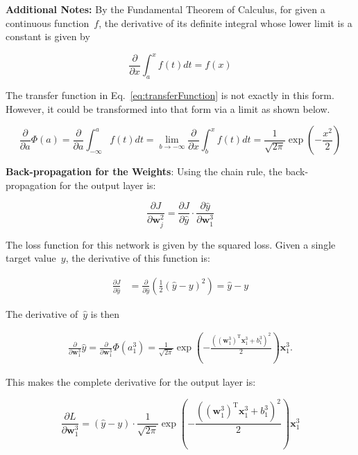 \documentclass{report}
\newcommand{\w}{\mathbf{w}}
\newcommand{\xvec}{\mathbf{x}}
\newcommand{\yhat}{\hat{y}}
\newcommand{\T}{\text{T}}
\begin{document}
  \textbf{Additional Notes:} By the Fundamental Theorem of Calculus, for given a continuous function~$f$, the derivative of its definite integral whose lower limit is a constant is given by
  
  \begin{equation}
    \frac{\partial}{\partial x}\int_{a}^{x}f(t)dt=f(x)
  \end{equation}
  
  The transfer function in Eq.~\ref{eq:transferFunction} is not exactly in this form.  However, it could be transformed into that form via a limit as shown below.
  
  \begin{equation}
    \frac{\partial}{\partial a} \Phi(a) = \frac{\partial}{\partial a} \int_{-\infty}^{a}f(t)dt =\underset{b\rightarrow -\infty}\lim \frac{\partial}{\partial x} \int_{b}^{x}f(t)dt=\frac{1}{\sqrt{2\pi}} \exp\left( -\frac{x^{2}}{2} \right)
  \end{equation}
  
  \textbf{Back-propagation for the Weights}: Using the chain rule, the back-propagation for the output layer is:
  
  \begin{equation}
    \frac{\partial J}{\partial \w_{j}^{2}} = \frac{\partial J}{\partial \yhat} \cdot \frac{\partial \yhat}{\partial \w_{1}^{3}}  
  \end{equation}
  
  The loss function for this network is given by the squared loss.  Given a single target value~$y$, the derivative of this function is:
  
  \begin{align}
    \frac{\partial J}{\partial \yhat} &= \frac{\partial}{\partial \yhat} \left(\frac{1}{2} \left( \yhat - y\right)^2 \right) = \yhat - y \label{eq:derivLoss}
  \end{align}
  
  The derivative of~$\yhat$ is then
  
  \begin{align}
    \frac{\partial}{\partial \w_{1}^{3}} \yhat = \frac{\partial}{\partial \w_{1}^{3}}\Phi(a_{1}^{3})=\frac{1}{\sqrt{2\pi}} \exp\left( -\frac{\left(\left(\w_{1}^{3}\right)^\T\xvec_{1}^{3}+b_{1}^{3}\right)^{2}}{2} \right)\xvec_{1}^{3}\textrm{.}
  \end{align}
  
  This makes the complete derivative for the output layer is:
  
  \begin{equation}
    \frac{\partial L}{\partial \w_{1}^{3}} = \boxed{\left( \yhat - y \right) \cdot \frac{1}{\sqrt{2\pi}} \exp\left( -\frac{\left(\left(\w_{1}^{3}\right)^\T\xvec_{1}^{3}+b_{1}^{3}\right)^{2}}{2} \right)\xvec_{1}^{3}} \label{eq:outputLayerDerivative}
  \end{equation}
    
\end{document}
